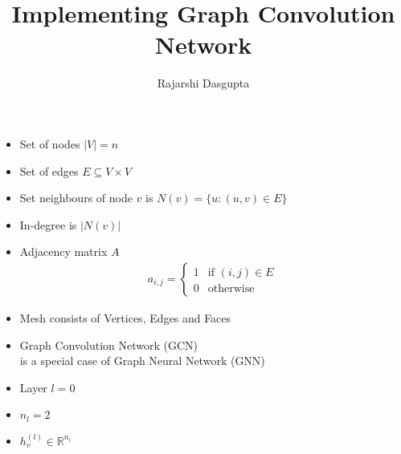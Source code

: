 \documentclass{article}
\title{Implementing Graph Convolution Network}
\author{
	Rajarshi Dasgupta
	}
\newcommand{\mat}[1]{\ensuremath{
	\begin{bmatrix}
		#1
	\end{bmatrix}
	}}
\begin{document}
	\begin{itemize}
		\item Set of nodes $|V| = n$
		\item Set of edges $E \subseteq V \times V$
		\item Set neighbours of node $v$ is $N(v) = \{ u : (u,v) \in E \}$
		\item In-degree is $|N(v)|$
		\item Adjacency matrix $A$
			\begin{align*}
				a_{i,j} =
				\begin{cases}
					1 & \mbox{if } (i,j) \in E \\
					0 & \mbox{otherwise}
				\end{cases}
			\end{align*}
		\item Mesh consists of Vertices, Edges and Faces
		\item Graph Convolution Network (GCN) \\
			is a special case of Graph Neural Network (GNN)
	\end{itemize}

			\begin{center}
			\end{center}

			\begin{itemize}
				\item Layer $l=0$
				\item $n_l = 2$
				\item $h_v^{(l)} \in \mathbb{R}^{n_l}$
			\end{itemize}
\end{document}
